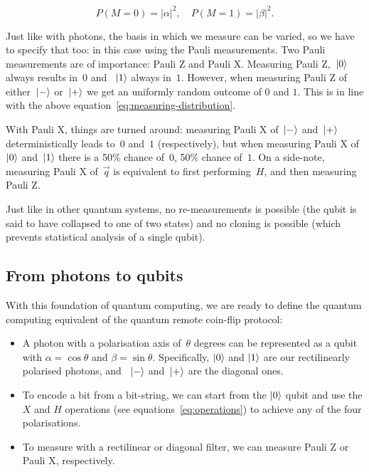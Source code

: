 \documentclass[oneside,a4paper]{article}
\begin{document}
\begin{equation}
    \label{eq:measuring-distribution}
    P(M=0) = |\alpha|^2,
    \quad P(M=1) = |\beta|^2.
\end{equation}

Just like with photons, the basis in which we measure can be varied, so we have to specify that too: in this case using the Pauli measurements.
Two Pauli measurements are of importance: Pauli Z and Pauli X.
Measuring Pauli Z,~$\ket{0}$ always results in~$0$ and ~$\ket{1}$ always in~$1$.
However, when measuring Pauli Z of either~$\ket{-}$ or~$\ket{+}$ we get an uniformly random outcome of $0$ and $1$. This is in line with the above equation~\ref{eq:measuring-distribution}.

With Pauli X, things are turned around: measuring Pauli X of~$\ket{-}$ and~$\ket{+}$ deterministically leads to~$0$ and~$1$ (respectively), but when measuring Pauli X of~$\ket{0}$ and~$\ket{1}$ there is a 50\% chance of~$0$, 50\% chance of~$1$.
On a side-note, measuring Pauli X of~$\vec{q}$ is equivalent to first performing~$H$, and then measuring Pauli Z.

Just like in other quantum systems, no re-measurements is possible (the qubit is said to have collapsed to one of two states) and no cloning is possible (which prevents statistical analysis of a single qubit).

\subsection{From photons to qubits}
With this foundation of quantum computing, we are ready to define the quantum computing equivalent of the quantum remote coin-flip protocol:

\begin{itemize}
    \item A photon with a polarisation axis of~$\theta$ degrees can be represented as a qubit with $\alpha=\cos{\theta}$ and $\beta=\sin{\theta}$.
    Specifically, $\ket{0}$ and $\ket{1}$ are our rectilinearly polarised photons, and ~$\ket{-}$ and~$\ket{+}$ are the diagonal ones.
    \item To encode a bit from a bit-string, we can start from the $\ket{0}$ qubit and use the $X$ and $H$ operations (see equations~\ref{eq:operations}) to achieve any of the four polarisations.
    \item To measure with a rectilinear or diagonal filter, we can measure Pauli Z or Pauli X, respectively.
\end{itemize}
\end{document}
